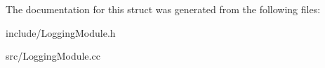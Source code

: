 The documentation for this struct was generated from the following files\+:\begin{DoxyCompactItemize}
\item 
include/Logging\+Module.\+h\item 
src/Logging\+Module.\+cc\end{DoxyCompactItemize}
